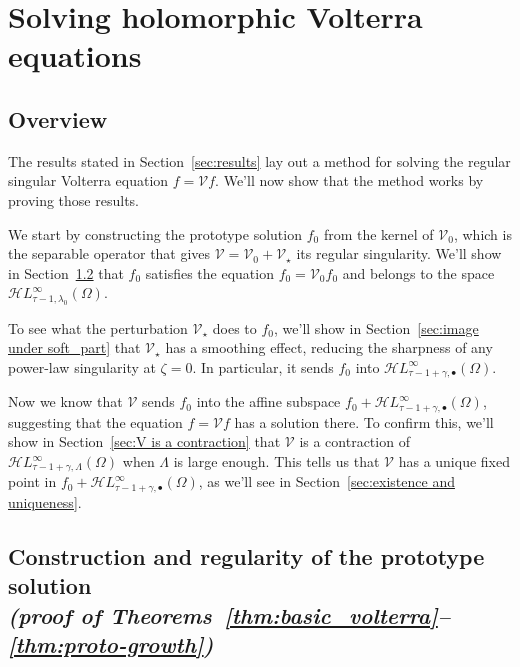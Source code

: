 \documentclass{article}
\theoremstyle{definition}
\theoremstyle{plain}
\newcommand{\singexp}[2]{\mathcal{H}L^\infty_{#1, #2}}
\newcommand{\singexpalg}[1]{\singexp{#1}{\bullet}}
\newcommand{\volterra}{\mathcal{V}}
\newcommand{\hardpart}{\mathcal{V}_0}
\newcommand{\softpart}{\mathcal{V}_\star}
\newcommand{\solwhole}{f}
\newcommand{\solproto}{f_0}
\newcommand{\domain}{\Omega}
\begin{document}
\section{Solving holomorphic Volterra equations}\label{sec:proof_main_results}
\subsection{Overview}
The results stated in Section~\ref{sec:results} lay out a method for solving the regular singular Volterra equation $\solwhole = \volterra \solwhole$. We'll now show that the method works by proving those results.

We start by constructing the prototype solution $\solproto$ from the kernel of $\hardpart$, which is the separable operator that gives $\volterra = \hardpart + \softpart$ its regular singularity. We'll show in Section~\ref{sec:proto-construction-regularity} that $\solproto$ satisfies the equation $\solproto = \hardpart \solproto$ and belongs to the space $\singexp{\tau-1}{\lambda_0}(\domain)$.

To see what the perturbation $\softpart$ does to $\solproto$, we'll show in Section~\ref{sec:image under soft_part} that $\softpart$ has a smoothing effect, reducing the sharpness of any power-law singularity at $\zeta = 0$. In particular, it sends $\solproto$ into $\singexpalg{\tau-1+\gamma}(\domain)$.

Now we know that $\volterra$ sends $\solproto$ into the affine subspace $\solproto + \singexpalg{\tau-1+\gamma}(\domain)$, suggesting that the equation $\solwhole = \volterra \solwhole$ has a solution there. To confirm this, we'll show in Section~\ref{sec:V is a contraction} that $\volterra$ is a contraction of $\singexp{\tau-1+\gamma}{\Lambda}(\domain)$ when $\Lambda$ is large enough. This tells us that $\volterra$ has a unique fixed point in $\solproto + \singexpalg{\tau-1+\gamma}(\domain)$, as we'll see in Section~\ref{sec:existence and uniqueness}.
\subsection{Construction and regularity of the prototype solution \\ \textit{(proof of Theorems~\ref{thm:basic_volterra}--\ref{thm:proto-growth})}}\label{sec:proto-construction-regularity}
\end{document}
